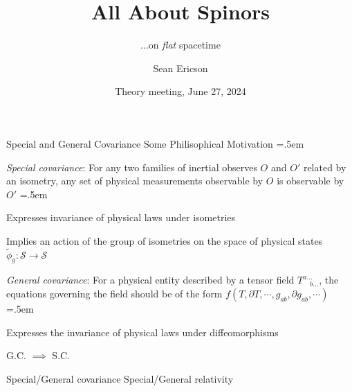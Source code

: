 \documentclass[xcolor={dvipsnames}]{beamer}
\title{All About Spinors}
\subtitle{...on \textit{flat} spacetime}
\author{Sean Ericson}
\institute{UO}
\date{Theory meeting, June 27, 2024}
\let\olditemize=\itemize
\let\endolditemize=\enditemize
\renewenvironment{itemize}{\olditemize \itemsep=.5em }{\endolditemize}
\begin{document}
\frame{\titlepage}

\begin{frame}{Special and General Covariance}
    \alert{Some Philisophical Motivation}
    \begin{itemize}
        \item<2-> \textit{Special covariance}: For any two families of inertial observes $O$ and $O'$ related by an isometry, any set of physical measurements observable by $O$ is observable by $O'$
        \begin{itemize}
            \item<3-> Expresses invariance of physical laws under isometries
            \item<4-> Implies an action of the group of isometries on the space of physical states $\tilde{\phi}_g:\mathcal{S}\rightarrow\mathcal{S}$
        \end{itemize} 
        \item<5-> \textit{General covariance}: For a physical entity described by a tensor field $T_{\quad b\dots}^{a\dots}$, the equations governing the field should be of the form $f(T, \partial T, \cdots, g_{ab}, \partial g_{ab}, \cdots)$
        \begin{itemize}
            \item<6-> Expresses the invariance of physical laws under diffeomorphisms
            \item<7-> G.C. $\implies$ S.C.
        \end{itemize}
        \item<8-> Special/General covariance \textrightarrow Special/General relativity
    \end{itemize}
\end{frame}
\end{document}
